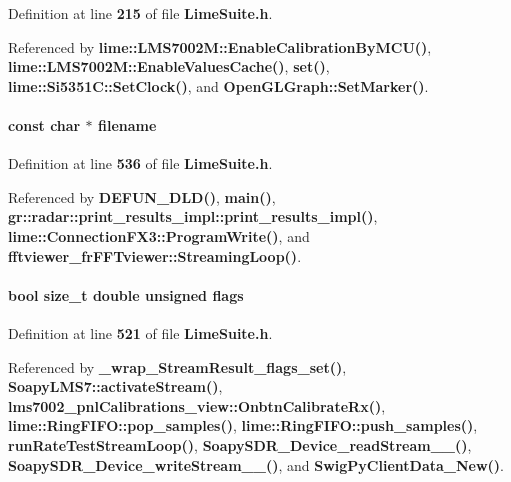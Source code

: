 Definition at line {\bf 215} of file {\bf Lime\+Suite.\+h}.



Referenced by {\bf lime\+::\+L\+M\+S7002\+M\+::\+Enable\+Calibration\+By\+M\+C\+U()}, {\bf lime\+::\+L\+M\+S7002\+M\+::\+Enable\+Values\+Cache()}, {\bf set()}, {\bf lime\+::\+Si5351\+C\+::\+Set\+Clock()}, and {\bf Open\+G\+L\+Graph\+::\+Set\+Marker()}.

\paragraph[{filename}]{\setlength{\rightskip}{0pt plus 5cm}const char $\ast$ filename}\label{group__FN__HIGH__LVL_ga28849770c8bfeb04039d7dd29d4dfa35}


Definition at line {\bf 536} of file {\bf Lime\+Suite.\+h}.



Referenced by {\bf D\+E\+F\+U\+N\+\_\+\+D\+L\+D()}, {\bf main()}, {\bf gr\+::radar\+::print\+\_\+results\+\_\+impl\+::print\+\_\+results\+\_\+impl()}, {\bf lime\+::\+Connection\+F\+X3\+::\+Program\+Write()}, and {\bf fftviewer\+\_\+fr\+F\+F\+Tviewer\+::\+Streaming\+Loop()}.

\paragraph[{flags}]{\setlength{\rightskip}{0pt plus 5cm}bool size\+\_\+t double unsigned flags}\label{group__FN__HIGH__LVL_ga73c01a58a13194faf47a78ed0917247d}


Definition at line {\bf 521} of file {\bf Lime\+Suite.\+h}.



Referenced by {\bf \+\_\+wrap\+\_\+\+Stream\+Result\+\_\+flags\+\_\+set()}, {\bf Soapy\+L\+M\+S7\+::activate\+Stream()}, {\bf lms7002\+\_\+pnl\+Calibrations\+\_\+view\+::\+Onbtn\+Calibrate\+Rx()}, {\bf lime\+::\+Ring\+F\+I\+F\+O\+::pop\+\_\+samples()}, {\bf lime\+::\+Ring\+F\+I\+F\+O\+::push\+\_\+samples()}, {\bf run\+Rate\+Test\+Stream\+Loop()}, {\bf Soapy\+S\+D\+R\+\_\+\+Device\+\_\+read\+Stream\+\_\+\+\_\+()}, {\bf Soapy\+S\+D\+R\+\_\+\+Device\+\_\+write\+Stream\+\_\+\+\_\+()}, and {\bf Swig\+Py\+Client\+Data\+\_\+\+New()}.

